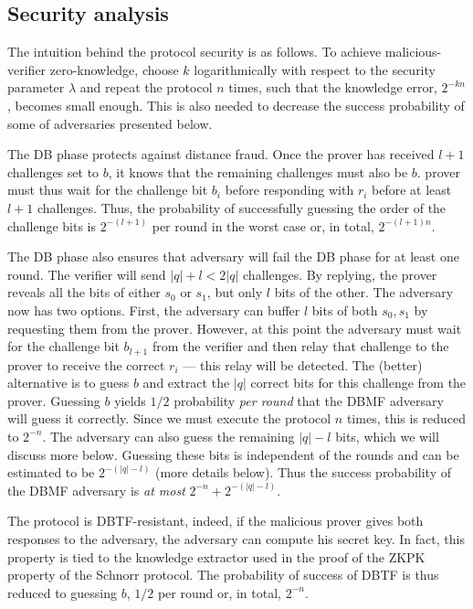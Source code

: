 \subsection{Security analysis}

The intuition behind the protocol security is as follows.
To achieve malicious-verifier zero-knowledge, choose \(k\) logarithmically with 
respect to the security parameter \(\lambda\) and repeat the protocol \(n\) 
times, such that the knowledge error, \(2^{-kn}\), becomes small enough.
This is also needed to decrease the success probability of some of adversaries 
presented below.

The \ac{DB} phase protects against distance fraud.
Once the prover has received \(l+1\) challenges set to \(b\), it knows that the 
remaining challenges must also be \(b\).
 prover must thus wait for the challenge bit \(b_i\) before 
responding with \(r_i\) before at least \(l+1\) challenges.
Thus, the probability of successfully guessing the order of the challenge bits 
is \(2^{-(l+1)}\) per round in the worst case or, in total, \(2^{-(l+1)n}\).

The \ac{DB} phase also ensures that  adversary will fail the \ac{DB} 
phase for at least one round.
The verifier will send \(|q| + l < 2|q|\) challenges.
By replying, the prover reveals all the bits of either \(s_0\) or \(s_1\), but 
only \(l\) bits of the other.
The adversary now has two options.
First, the adversary can buffer \(l\) bits of both \(s_0, s_1\) by requesting 
them from the prover.
However, at this point the adversary must wait for the challenge bit 
\(b_{l+1}\) from the verifier and then relay that challenge to the prover to 
receive the correct \(r_i\) --- this relay will be detected.
The (better) alternative is to guess \(b\) and extract the \(|q|\) correct bits 
for this challenge from the prover.
Guessing \(b\) yields \(1/2\) probability \emph{per round} that the \ac{DBMF} 
adversary will guess it correctly.
Since we must execute the protocol \(n\) times, this is reduced to \(2^{-n}\).
The adversary can also guess the remaining \(|q|-l\) bits, which we will 
discuss more below.
Guessing these bits is independent of the rounds and can be estimated to be 
\(2^{-(|q|-l)}\) (more details below).
Thus the success probability of the \ac{DBMF} adversary is \emph{at most} 
\(2^{-n}+2^{-(|q|-l)}\).

The protocol is \ac{DBTF}-resistant, indeed, if the malicious prover gives both 
responses to the adversary, the adversary can compute his secret key.
In fact, this property is tied to the knowledge extractor used in the proof of 
the \ac{ZKPK} property of the Schnorr protocol.
The probability of success of \ac{DBTF} is thus reduced to guessing \(b\), \ie 
\(1/2\) per round or, in total, \(2^{-n}\).

